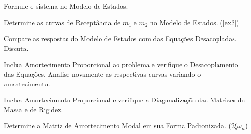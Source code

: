 \documentclass{article}
\begin{document}
\newpage\begin{exercise}\label{ex9}
    Formule o sistema no Modelo de Estados.
\end{exercise}
\begin{resolution}
    
\end{resolution}


\newpage\begin{exercise}\label{ex10}
    Determine as curvas de Receptância de $m_1$ e $m_2$ no Modelo de Estados. (\ref{ex3})
\end{exercise}
\begin{resolution}
    
\end{resolution}


\newpage\begin{exercise}\label{ex11}
    Compare as respostas do Modelo de Estados com das Equações Desacopladas. Discuta.
\end{exercise}
\begin{resolution}
    
\end{resolution}


\newpage\begin{exercise}\label{ex12}
    Inclua Amortecimento Proporcional ao problema e verifique o Desacoplamento das Equações. Analise novamente as respectivas curvas variando o amortecimento.
\end{exercise}
\begin{resolution}
    
\end{resolution}


\newpage\begin{exercise}\label{ex13}
    Inclua Amortecimento Proporcional e verifique a Diagonalização das Matrizes de Massa e de Rigidez.
\end{exercise}
\begin{resolution}
    
\end{resolution}


\newpage\begin{exercise}\label{ex14}
    Determine a Matriz de Amortecimento Modal em sua Forma Padronizada. ($2\xi\omega_n$)
\end{exercise}
\begin{resolution}
    
\end{resolution}
\end{document}
